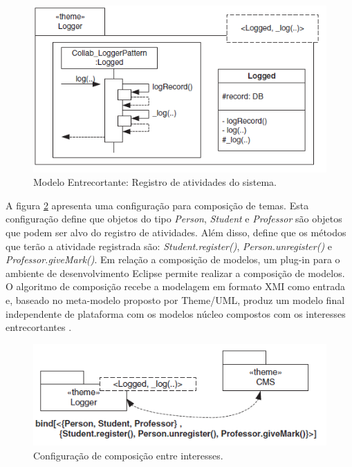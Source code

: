 \begin{figure}
	\centering
	\includegraphics{img/theme_2.png}
	\caption{Modelo Entrecortante: Registro de atividades do sistema.}\label{fig:theme_2}
\end{figure}

A figura \ref{fig:theme_3} apresenta uma configuração para composição de temas. Esta configuração define que objetos do tipo \textit{Person},
\textit{Student} e \textit{Professor} são objetos que podem ser alvo do registro de atividades. Além disso, define que os métodos que terão a
atividade registrada são: \textit{Student.register()}, \textit{Person.unregister()} e \textit{Professor.giveMark()}. Em relação a composição de
modelos, um plug-in para o ambiente de desenvolvimento Eclipse \cite{Eclipse} permite realizar a composição de modelos. O algoritmo de composição
recebe a modelagem em formato XMI como entrada e, baseado no meta-modelo proposto por Theme/UML, produz um modelo final independente de plataforma com
os modelos núcleo compostos com os interesses entrecortantes \cite{Carton:2009:MT:1692821.1692829}. 

\begin{figure}
	\centering
	\includegraphics{img/theme_3.png}
	\caption{Configuração de composição entre interesses.}\label{fig:theme_3}
\end{figure}

